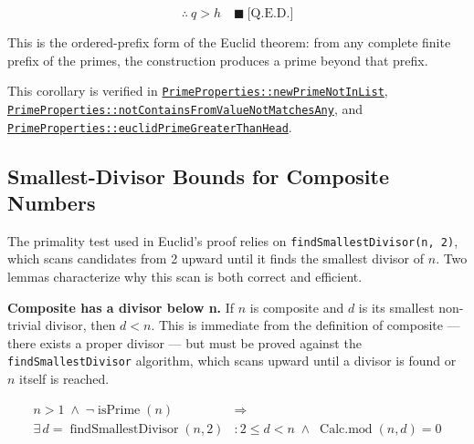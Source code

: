 \begin{equation*}
\therefore\ q>h
\quad\blacksquare\ \text{[Q.E.D.]}
\end{equation*}

This is the ordered-prefix form of the Euclid theorem: from any complete
finite prefix of the primes, the construction produces a prime beyond that
prefix.

{\raggedright
This corollary is verified in
\href{https://github.com/thiagomata/prime-numbers/blob/euclid-theorem-article-v1.0.0/src/main/scala/v1/chapter5/prime/properties/PrimeProperties.scala}{\texttt{PrimeProperties::newPrimeNotInList}},
\href{https://github.com/thiagomata/prime-numbers/blob/euclid-theorem-article-v1.0.0/src/main/scala/v1/chapter5/prime/properties/PrimeProperties.scala}{\texttt{PrimeProperties::notContainsFromValueNotMatchesAny}},
and
\href{https://github.com/thiagomata/prime-numbers/blob/euclid-theorem-article-v1.0.0/src/main/scala/v1/chapter5/prime/properties/PrimeProperties.scala}{\texttt{PrimeProperties::euclidPrimeGreaterThanHead}}.
\par}

\subsection{Smallest-Divisor Bounds for Composite Numbers}
\label{sec:smallest-divisor-bounds}

The primality test used in Euclid's proof relies on
\texttt{findSmallestDivisor(n, 2)}, which scans candidates from 2 upward
until it finds the smallest divisor of $n$. Two lemmas characterize why
this scan is both correct and efficient.

\textbf{Composite has a divisor below n.} If $n$ is composite and $d$ is
its smallest non-trivial divisor, then $d < n$. This is immediate from the
definition of composite --- there exists a proper divisor --- but must be
proved against the \texttt{findSmallestDivisor} algorithm, which scans
upward until a divisor is found or $n$ itself is reached.

\begin{equation*}
\begin{aligned}
n > 1 \;\land\; \neg \operatorname{isPrime}(n) &\Rightarrow \\
\exists\, d = \operatorname{findSmallestDivisor}(n, 2) &: 2 \leq d < n \;\land\; \operatorname{Calc.mod}(n, d) = 0
\end{aligned}
\end{equation*}

